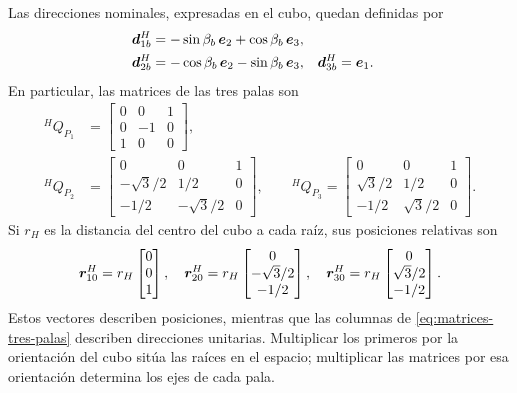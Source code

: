 Las direcciones nominales, expresadas en el cubo, quedan definidas por
\begin{align}
 \bm{d}_{1b}^H&=-\sin\beta_b\,\bm{e}_2+\cos\beta_b\,\bm{e}_3,\\
 \bm{d}_{2b}^H&=-\cos\beta_b\,\bm{e}_2-\sin\beta_b\,\bm{e}_3,
 &\bm{d}_{3b}^H&=\bm{e}_1.
\end{align}
En particular, las matrices de las tres palas son
\begin{align}
 {}^HQ_{P_1}&=\begin{bmatrix}0&0&1\\0&-1&0\\1&0&0\end{bmatrix},\\
 {}^HQ_{P_2}&=\begin{bmatrix}
 0&0&1\\-\sqrt3/2&1/2&0\\-1/2&-\sqrt3/2&0
 \end{bmatrix},\qquad
 {}^HQ_{P_3}=\begin{bmatrix}
 0&0&1\\\sqrt3/2&1/2&0\\-1/2&\sqrt3/2&0
 \end{bmatrix}.
 \label{eq:matrices-tres-palas}
\end{align}
Si $r_H$ es la distancia del centro del cubo a cada raíz, sus posiciones relativas son
\begin{equation}
 \bm{r}_{10}^H=r_H\begin{bmatrix}0\\0\\1\end{bmatrix},\quad
 \bm{r}_{20}^H=r_H\begin{bmatrix}0\\-\sqrt3/2\\-1/2\end{bmatrix},\quad
 \bm{r}_{30}^H=r_H\begin{bmatrix}0\\\sqrt3/2\\-1/2\end{bmatrix}.
 \label{eq:raices-tres-palas}
\end{equation}
Estos vectores describen posiciones, mientras que las columnas de \eqref{eq:matrices-tres-palas} describen direcciones unitarias. Multiplicar los primeros por la orientación del cubo sitúa las raíces en el espacio; multiplicar las matrices por esa orientación determina los ejes de cada pala.

